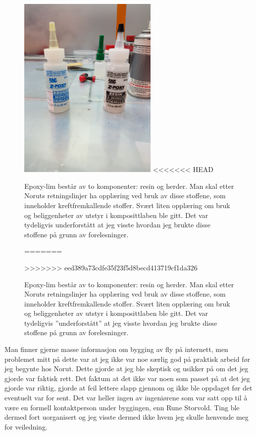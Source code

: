 \documentclass[12pt, a4paper]{article}
\begin{document}
\begin{figure}[h]
	\centering
	\includegraphics[width = .6\textwidth, height=9cm]{bilder/epoxyresin.jpg}
<<<<<<< HEAD
	\caption{Epoxy-lim består av to komponenter: resin og herder. Man skal etter Noruts retningslinjer ha opplæring ved bruk av disse stoffene, som inneholder kreftfremkallende stoffer. Svært liten opplæring om bruk og beliggenheter av utstyr i komposittlaben ble gitt. Det var tydeligvis underforstått at jeg visste hvordan jeg brukte disse stoffene på grunn av forelesninger.}
=======
	\caption[Epoxy og herder]{Epoxy-lim består av to komponenter: resin og herder. Man skal etter Noruts retningslinjer ha opplæring ved bruk av disse stoffene, som inneholder kreftfremkallende stoffer. Svært liten opplæring om bruk og beliggenheter av utstyr i komposittlaben ble gitt. Det var tydeligvis ''underforstått'' at jeg visste hvordan jeg brukte disse stoffene på grunn av forelesninger.}
>>>>>>> eed389a73cdfe35f23f5d8becd413719cf1da326
\end{figure}

Man finner gjerne masse informasjon om bygging av fly på internett, men problemet mitt på dette var at jeg ikke var noe særlig god på praktisk arbeid før jeg begynte hos Norut. Dette gjorde at jeg ble skeptisk og usikker på om det jeg gjorde var faktisk rett. Det faktum at det ikke var noen som passet på at det jeg gjorde var riktig, gjorde at feil lettere slapp gjennom og ikke ble oppdaget før det eventuelt var for sent. Det var heller ingen av ingeniørene som var satt opp til å være en formell kontaktperson under byggingen, enn Rune Storvold. Ting ble dermed fort uorganisert og jeg visste dermed ikke hvem jeg skulle henvende meg for veiledning. \\
\end{document}
